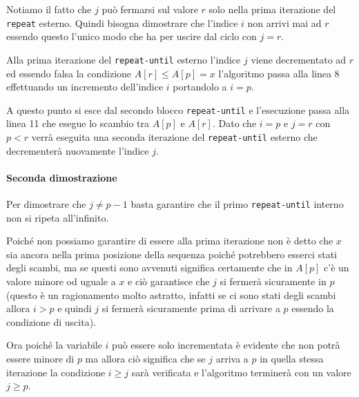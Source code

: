 Notiamo il fatto che $j$ può fermarsi sul valore $r$ solo nella prima iterazione del \texttt{repeat} esterno. Quindi bisogna dimostrare che l'indice $i$ non arrivi mai ad $r$ essendo questo l'unico modo che ha per uscire dal ciclo con $j=r$.

Alla prima iterazione del \texttt{repeat-until} esterno l'indice $j$ viene decrementato ad $r$ ed essendo falsa la condizione $A[r]\leq A[p]=x$ l'algoritmo passa alla linea 8 effettuando un incremento dell'indice $i$ portandolo a $i=p$.

A questo punto si esce dal secondo blocco \texttt{repeat-until} e l'esecuzione passa alla linea 11 che esegue lo scambio tra $A[p]$ e $A[r]$. Dato che $i=p$ e $j=r$ con $p<r$ verrà eseguita una seconda iterazione del \texttt{repeat-until} esterno che decrementerà nuovamente l'indice $j$.
\begin{flushright}
	\blacksquare
\end{flushright}

\paragraph{Seconda dimostrazione}
Per dimostrare che  $j \neq p-1$ basta garantire che il primo \texttt{repeat-until} interno non si ripeta all'infinito.

Poiché non possiamo garantire di essere alla prima iterazione non è detto che $x$ sia ancora nella prima posizione della sequenza poiché potrebbero esserci stati degli scambi, ma se questi sono avvenuti significa certamente che in $A[p]$ c’è un valore minore od uguale a $x$ e ciò garantisce che $j$ si fermerà sicuramente in $p$ (questo è un ragionamento molto astratto, infatti se ci sono stati degli scambi allora $i > p$ e quindi $j$ si fermerà sicuramente prima di arrivare a $p$ essendo la condizione di uscita).

Ora poiché la variabile $i$ può essere solo incrementata è evidente che non potrà essere minore di $p$ ma allora ciò significa che se $j$ arriva a $p$ in quella stessa iterazione la condizione $i \geq j$ sarà verificata e l’algoritmo terminerà con un valore $j \geq p$.
\begin{flushright}
	\blacksquare
\end{flushright}

